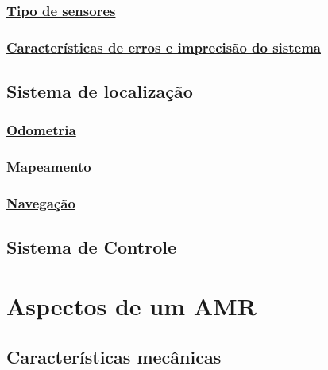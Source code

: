     \subsubsection{\uline{Tipo de sensores}}

    \subsubsection{\uline{Características de erros e imprecisão do sistema}}

    \subsection{Sistema de localização}

    \subsubsection{\uline{Odometria}}

    \subsubsection{\uline{Mapeamento}}

    \subsubsection{\uline{Navegação}}

    \subsection{Sistema de Controle}

    \section{\textbf{Aspectos de um AMR}}

    \subsection{Características mecânicas}

